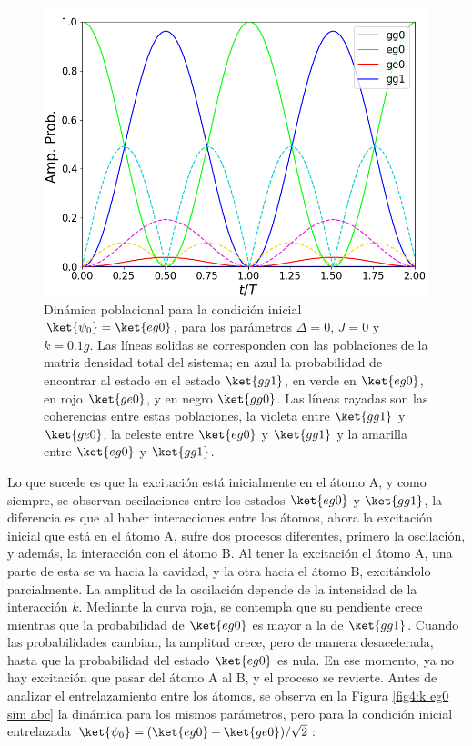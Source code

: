 \begin{figure}[h]
    \begin{minipage}[c]{0.67\textwidth}
        \includegraphics[width=\textwidth]{figuras/ch4/k eg0 ABC.png}
    \end{minipage}\hfill
    \begin{minipage}[c]{0.3\textwidth}
    \caption{Dinámica poblacional para la condición inicial $\ket{\psi_0}=\ket{eg0}$, para los parámetros $\Delta=0$, $J=0$ y $k=0.1g$. Las líneas solidas se corresponden con las poblaciones de la matriz densidad total del sistema; en azul la probabilidad de encontrar al estado en el estado $\ket{gg1}$, en verde en $\ket{eg0}$, en rojo $\ket{ge0}$, y en negro $\ket{gg0}$. Las líneas rayadas son las coherencias entre estas poblaciones, la violeta entre $\ket{gg1}$ y $\ket{ge0}$, la celeste entre $\ket{eg0}$ y $\ket{gg1}$ y la amarilla entre $\ket{eg0}$ y $\ket{gg1}$.
         } \label{fig4:k eg0 abc}
  \end{minipage}
\end{figure}
Lo que sucede es que la excitación está inicialmente en el átomo A, y como siempre, se observan oscilaciones entre los estados $\ket{eg0}$ y $\ket{gg1}$, la diferencia es que al haber interacciones entre los átomos, ahora la excitación inicial que está en el átomo A, sufre dos procesos diferentes, primero la oscilación, y además, la interacción con el átomo B. Al tener la excitación el átomo A, una parte de esta se va hacia la cavidad, y la otra hacia el átomo B, excitándolo parcialmente. La amplitud de la oscilación depende de la intensidad de la interacción $k$. Mediante la curva roja, se contempla que su pendiente crece mientras que la probabilidad de $\ket{eg0}$ es mayor a la de $\ket{gg1}$. Cuando las probabilidades cambian, la amplitud crece, pero de manera desacelerada, hasta que la probabilidad del estado $\ket{eg0}$ es nula. En ese momento, ya no hay excitación que pasar del átomo A al B, y el proceso se revierte. Antes de analizar el entrelazamiento entre los átomos, se observa en la Figura \ref{fig4:k eg0 sim abc} la dinámica para los mismos parámetros, pero para la condición inicial entrelazada $\ket{\psi_0}=(\ket{eg0}+\ket{ge0})/\sqrt{2}$:
